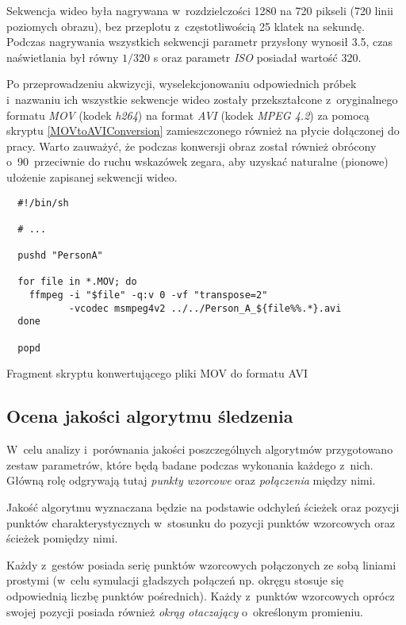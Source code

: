       Sekwencja wideo była nagrywana w~rozdzielczości 1280 na 720 pikseli (720 linii poziomych obrazu), bez przeplotu z~częstotliwością 25 klatek na sekundę. Podczas nagrywania wszystkich sekwencji parametr przysłony wynosił 3.5, czas naświetlania był równy $1/320$ s oraz parametr \textit{ISO} posiadał wartość 320.

      Po przeprowadzeniu akwizycji, wyselekcjonowaniu odpowiednich próbek i~nazwaniu ich wszystkie sekwencje wideo zostały przekształcone z~oryginalnego formatu \textit{MOV} (kodek \textit{h264}) na format \textit{AVI} (kodek \textit{MPEG 4.2}) za pomocą skryptu \ref{MOVtoAVIConversion} zamieszczonego również na płycie dołączonej do pracy. Warto zauważyć, że podczas konwersji obraz został również obrócony o~90\degree~przeciwnie do ruchu wskazówek zegara, aby uzyskać naturalne (pionowe) ułożenie zapisanej sekwencji wideo.

        \begin{sample}[ht]
          \begin{verbatim}
  #!/bin/sh

  # ...

  pushd "PersonA"

  for file in *.MOV; do
    ffmpeg -i "$file" -q:v 0 -vf "transpose=2"
           -vcodec msmpeg4v2 ../../Person_A_${file%%.*}.avi
  done

  popd
          \end{verbatim}
          \caption{Fragment skryptu konwertującego pliki MOV do formatu AVI}
          \label{MOVtoAVIConversion}
        \end{sample}

    \subsection{Ocena jakości algorytmu śledzenia}\label{Subsection_Jakosc}

      W~celu analizy i~porównania jakości poszczególnych algorytmów przygotowano zestaw parametrów, które będą badane podczas wykonania każdego z~nich. Główną rolę odgrywają tutaj \textit{punkty wzorcowe} oraz \textit{połączenia} między nimi.

      Jakość algorytmu wyznaczana będzie na podstawie odchyleń ścieżek oraz pozycji punktów charakterystycznych w~stosunku do pozycji punktów wzorcowych oraz ścieżek pomiędzy nimi.

      Każdy z~gestów posiada serię punktów wzorcowych połączonych ze sobą liniami prostymi (w~celu symulacji gładszych połączeń np. okręgu stosuje się odpowiednią liczbę punktów pośrednich). Każdy z~punktów wzorcowych oprócz swojej pozycji posiada również \textit{okrąg otaczający} o~określonym promieniu.

